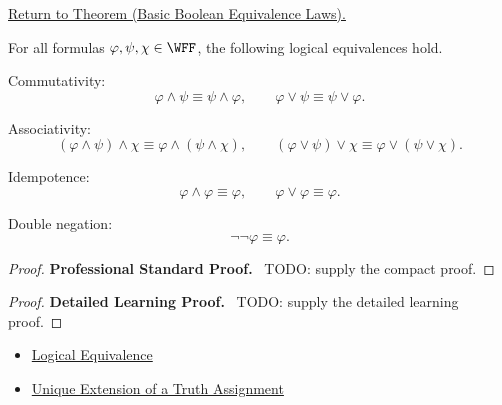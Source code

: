 \newpage
{}
\label{prf:basic-boolean-equivalence-laws-propositional-logic}

\begin{remark*}[Return]
\hyperref[thm:basic-boolean-equivalence-laws-propositional-logic]{Return to Theorem (Basic Boolean Equivalence Laws).}
\end{remark*}

\begin{theorem*}
For all formulas \(\varphi,\psi,\chi\in\WFF\), the following logical equivalences hold.

Commutativity:
\[
\varphi\land\psi\equiv\psi\land\varphi,
\qquad
\varphi\lor\psi\equiv\psi\lor\varphi.
\]

Associativity:
\[
(\varphi\land\psi)\land\chi
\equiv
\varphi\land(\psi\land\chi),
\qquad
(\varphi\lor\psi)\lor\chi
\equiv
\varphi\lor(\psi\lor\chi).
\]

Idempotence:
\[
\varphi\land\varphi\equiv\varphi,
\qquad
\varphi\lor\varphi\equiv\varphi.
\]

Double negation:
\[
\neg\neg\varphi\equiv\varphi.
\]
\end{theorem*}

\begin{proof}
\textbf{Professional Standard Proof.}~
TODO: supply the compact proof.
\end{proof}

\begin{proof}
\textbf{Detailed Learning Proof.}~
TODO: supply the detailed learning proof.
\end{proof}

\begin{remark*}
\end{remark*}

\begin{dependencies}
\begin{itemize}
  \item \hyperref[def:logical-equivalence-propositional-logic]{Logical Equivalence}
  \item \hyperref[thm:unique-extension-truth-assignment-propositional-logic]{Unique Extension of a Truth Assignment}
\end{itemize}
\end{dependencies}

\clearpage
